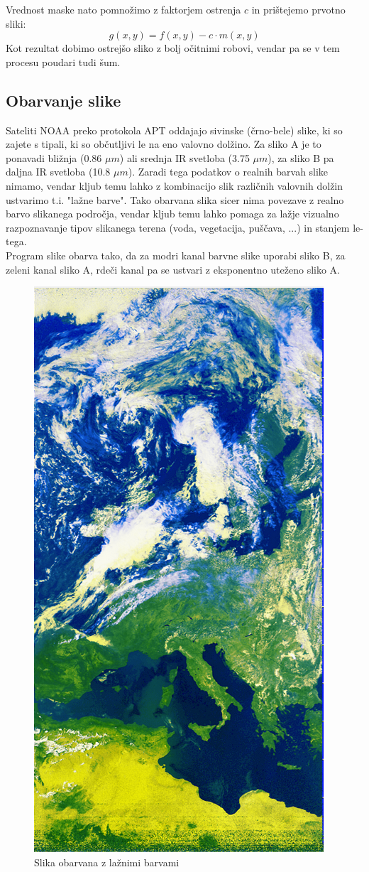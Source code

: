 \documentclass[a4paper, twocolumn]{article}
\begin{document}
Vrednost maske nato pomnožimo z faktorjem ostrenja $c$ in prištejemo prvotno sliki:
\begin{equation}
g(x,y)=f(x,y)-c \cdot m(x,y)
\end{equation}
Kot rezultat dobimo ostrejšo sliko z bolj očitnimi robovi, vendar pa se v tem procesu poudari tudi šum.

\subsection{Obarvanje slike}
Sateliti NOAA preko protokola APT oddajajo sivinske (črno-bele) slike, ki so zajete s tipali, ki so občutljivi le na eno valovno dolžino. Za sliko A je to ponavadi bližnja (0.86 $\mu m$) ali srednja IR svetloba (3.75 $\mu m$), za sliko B pa daljna IR svetloba (10.8 $\mu m$). Zaradi tega podatkov o realnih barvah slike nimamo, vendar kljub temu lahko z kombinacijo slik različnih valovnih  dolžin ustvarimo t.i. "lažne barve". Tako obarvana slika sicer nima povezave z realno barvo slikanega področja, vendar kljub temu lahko pomaga za lažje vizualno razpoznavanje tipov slikanega terena (voda, vegetacija, puščava, ...) in stanjem le-tega.\\
Program slike obarva tako, da za modri kanal barvne slike uporabi sliko B, za zeleni kanal sliko A, rdeči kanal pa se ustvari z eksponentno uteženo sliko A.

\begin{figure}[h]
	\centering
	\includegraphics[width=0.4\linewidth]{false_color.png}
	\caption {Slika obarvana z lažnimi barvami}
\end{figure}
\end{document}

